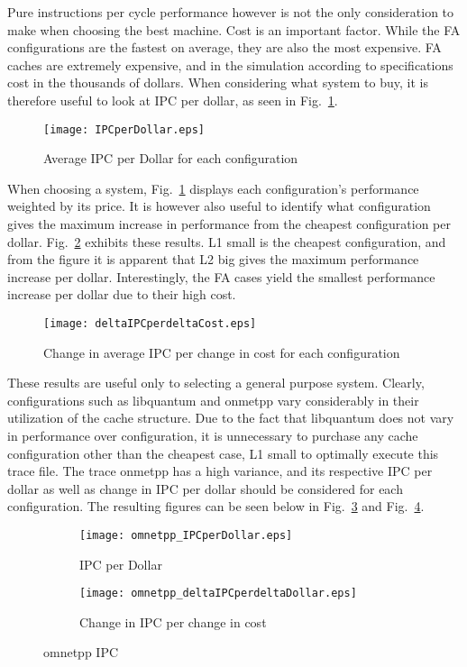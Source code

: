 \documentclass[FinalReport.tex]{subfiles}
\begin{document}
Pure instructions per cycle performance however is not the only consideration to make when choosing the best machine. Cost is an important factor. While the FA configurations are the fastest on average, they are also the most expensive. FA caches are extremely expensive, and in the simulation according to specifications cost in the thousands of dollars. When considering what system to buy, it is therefore useful to look at IPC per dollar, as seen in Fig.~\ref{fig:IPCperDollar}.

\begin{figure}[H]
\centering
\texttt{[image: IPCperDollar.eps]}
\caption{Average IPC per Dollar for each configuration\label{fig:IPCperDollar}}
\end{figure}

When choosing a system, Fig.~\ref{fig:IPCperDollar} displays each configuration's performance weighted by its price. It is however also useful to identify what configuration gives the maximum increase in performance from the cheapest configuration per dollar. Fig.~\ref{fig:deltaIPCperDollar} exhibits these results. L1 small is the cheapest configuration, and from the figure it is apparent that L2 big gives the maximum performance increase per dollar. Interestingly, the FA cases yield the smallest performance increase per dollar due to their high cost.

\begin{figure}[H]
\centering
\texttt{[image: deltaIPCperdeltaCost.eps]}
\caption{Change in average IPC per change in cost for each configuration\label{fig:deltaIPCperDollar}}
\end{figure}

 These results are useful only to selecting a general purpose system.  Clearly, configurations such as libquantum and onmetpp vary considerably in their utilization of the cache structure. Due to the fact that libquantum does not vary in performance over configuration, it is unnecessary to purchase any cache configuration other than the cheapest case, L1 small to optimally execute this trace file. The trace onmetpp has a high variance, and its respective IPC per dollar as well as change in IPC per dollar should be considered for each configuration. The resulting figures can be seen below in Fig.~\ref{fig:omnetppIPCperDollar} and Fig.~\ref{fig:deltaomnetppIPCperDollar}.

\begin{figure}[H]
\centering
\begin{subfigure}[b]{0.49\textwidth}
\texttt{[image: omnetpp\_IPCperDollar.eps]}
\caption{IPC per Dollar\label{fig:omnetppIPCperDollar}}
\end{subfigure}
\begin{subfigure}[b]{0.49\textwidth}
\texttt{[image: omnetpp\_deltaIPCperdeltaDollar.eps]}
\caption{Change in IPC per change in cost\label{fig:deltaomnetppIPCperDollar}}
\end{subfigure}
\caption{omnetpp IPC}\label{fig:omnetpp}
\end{figure}
\end{document}
